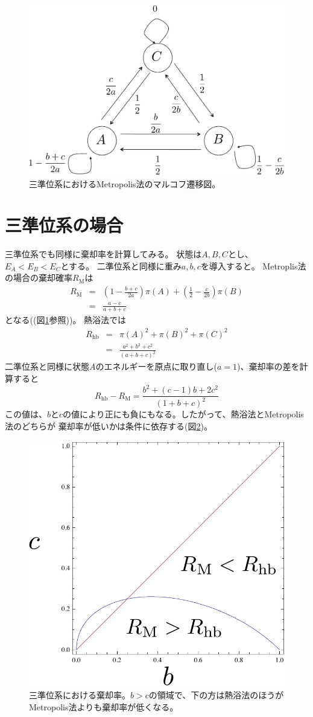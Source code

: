 \documentclass{jarticle}
\begin{document}
\begin{figure}[tb]
\begin{center}
\includegraphics[bb =0 0 678 475,width=0.5\linewidth]{level3.pdf}
\end{center}
\caption{三準位系におけるMetropolis法のマルコフ遷移図。}
\label{fig_level3}
\end{figure}

\section{三準位系の場合}


三準位系でも同様に棄却率を計算してみる。
状態は$A, B, C$とし、$E_A < E_B < E_C$とする。
二準位系と同様に重み$a, b, c$を導入すると。
Metroplis法の場合の棄却確率$R_\mathrm{M}$は
\begin{eqnarray}
R_\mathrm{M} &=& \left(1 -\frac{b+c}{2a} \right) \pi(A)  + \left(\frac{1}{2} - \frac{c}{2b} \right) \pi(B)\\
&=& \frac{a-c}{a+b+c}
\end{eqnarray}
となる((図\ref{fig_level3}参照))。
熱浴法では
\begin{eqnarray}
R_\mathrm{hb} &=& \pi(A)^2 +\pi(B)^2 + \pi(C)^2\\
&=& \frac{a^2+b^2+c^2}{(a+b+c)^2}
\end{eqnarray}
二準位系と同様に状態$A$のエネルギーを原点に取り直し($a=1$)、棄却率の差を計算すると
\begin{equation}
R_\mathrm{hb} - R_\mathrm{M} = \frac{b^2 + (c-1) b + 2 c^2}{(1+b+c)^2}
\end{equation}
この値は、$b$と$c$の値により正にも負にもなる。したがって、熱浴法とMetropolis法のどちらが
棄却率が低いかは条件に依存する(図\ref{fig_graph})。


\begin{figure}[bt]
\begin{center}
\includegraphics[bb =0 0 345 331,width=0.4\linewidth]{graph2.pdf}
\end{center}
\caption{三準位系における棄却率。$b>c$の領域で、下の方は熱浴法のほうがMetropolis法よりも棄却率が低くなる。}
\label{fig_graph}
\end{figure}
\end{document}
